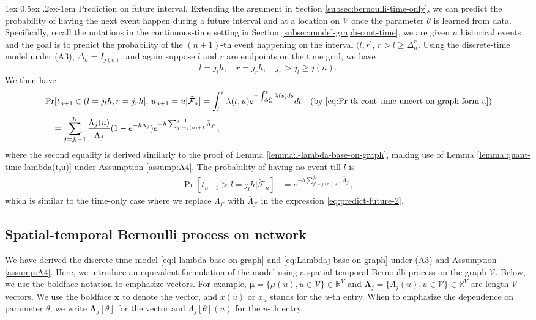 \documentclass[11pt]{article}
\makeatletter
\theoremstyle{remark}
\theoremstyle{plain}
\newcommand{\calF}{\mathcal{F}}
\newcommand{\calV}{\mathcal{V}}
\newcommand{\R}{\mathbb{R}}
\renewcommand{\paragraph}{%
  \@startsection{paragraph}{4}%
  {\z@}{1ex \@plus 0.5ex \@minus .2ex}{-1em}%
  {\normalfont\normalsize\itshape}%
}
\makeatother
\begin{document}
\paragraph{Prediction on future interval.}
Extending the argument in Section \ref{subsec:bernoulli-time-only}, we can predict the probability of having the next event happen during a future interval and at a location on $\calV$ once the parameter $\theta$ is learned from data. 
Specifically, recall the notations in the continuous-time setting in Section \ref{subsec:model-graph-cont-time}, we are given $n$ historical events and the goal is to predict the probability of the $({n+1})$-th event happening on the interval $( l,r]$, $r > l \ge  \Delta_{n}^r$.
Using the discrete-time model under (A3), $\Delta_n = I_{j(n)}$, and again suppose $l$ and $r$ are endpoints on the time grid, we have
\[
l = j_l h , \quad r = j_r h , \quad j_r > j_l \ge j(n).
\]
We then have
\begin{align}
& \Pr [ t_{n+1}\in  ( l= j_l h  , r = j_r h  ], \, u_{n+1} = u | \tilde{\calF}_{n}]
 = \int_l^r  \lambda(t,u) e^{- \int_{\Delta_{n}^r}^t \bar{\lambda}(s) ds} dt
	\quad \text{(by \eqref{eq:Pr-tk-cont-time-uncert-on-graph-form-a})} 	
	 \nonumber \\
&~~~
 = \sum_{j = j_l+1}^{j_r}  
	\frac{\Lambda_j(u)}{\bar{\Lambda}_j} ( 1- e^{- h \bar{\Lambda}_j} ) 
	e^{ - h \sum_{j' = j(n)+1}^{j-1}   \bar{\Lambda}_{j'}},
	\label{eq:predict-future-interval-network}
\end{align}
where the second equality is derived similarly to the proof of Lemma \ref{lemma:l-lambda-base-on-graph}, making use of Lemma \ref{lemma:quant-time-lambda(t,u)} under Assumption \ref{assump:A4}.
The probability of having no event till $l$ is 
\begin{align}
\Pr [ t_{n+1} > l = j_lh  | \tilde{\calF}_{n}]
& = 	e^{ - h \sum_{j' = j(n)+1}^{j_l }   \bar{\Lambda}_{j'}},
\end{align}
which is similar to the time-only case
where we replace ${\Lambda}_{j'}$ with  $\bar{\Lambda}_{j'}$ in the expression \eqref{eq:predict-future-2}.



\subsection{Spatial-temporal Bernoulli process on network}\label{subsec:bernoulli-graph}



We have derived the discrete time model  \eqref{eq:l-lambda-base-on-graph} and \eqref{eq:Lambdaj-base-on-graph} under 
(A3) and Assumption \ref{assump:A4}.
Here, we introduce an equivalent formulation of the model using a spatial-temporal  Bernoulli process on the graph $\calV$.
%
Below, we use the boldface notation to emphasize vectors. For example, 
$\boldsymbol{\mu} = \{ \mu(u), u \in \calV \} \in \R^{V}$ 
and $\mathbf{\Lambda}_j = \{ {\Lambda}_j(u), u \in \calV \} \in \R^V$
are length-$V$ vectors.
We use the boldface $\mathbf{x}$ to denote the vector, and $x(u)$ or $x_u$ stands for the $u$-th entry.
When to emphasize the dependence on parameter $\theta$, we write $\mathbf{\Lambda}_j [\theta]$ for the vector and ${\Lambda}_j [\theta](u)$ for the $u$-th entry.
\end{document}
